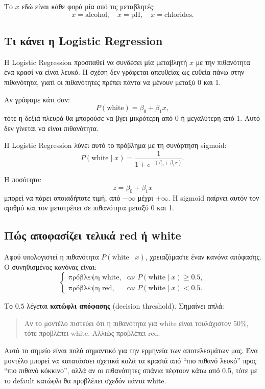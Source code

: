 \documentclass[11pt,a4paper]{article}
\newcommand{\eng}[1]{\textenglish{#1}}
\begin{document}
Το \(x\) εδώ είναι κάθε φορά μία από τις μεταβλητές:
\[
x = \text{alcohol}, \quad x = \text{pH}, \quad x = \text{chlorides}.
\]

\subsection{Τι κάνει η Logistic Regression}

Η Logistic Regression προσπαθεί να συνδέσει μία μεταβλητή \(x\) με την
πιθανότητα ένα κρασί να είναι λευκό. Η σχέση δεν γράφεται απευθείας ως
ευθεία πάνω στην πιθανότητα, γιατί οι πιθανότητες πρέπει πάντα να μένουν
μεταξύ 0 και 1.

Αν γράφαμε κάτι σαν:
\[
P(\text{white}) = \beta_0 + \beta_1 x,
\]
τότε η δεξιά πλευρά θα μπορούσε να βγει μικρότερη από 0 ή μεγαλύτερη από 1.
Αυτό δεν γίνεται να είναι πιθανότητα.

Η Logistic Regression λύνει αυτό το πρόβλημα με τη συνάρτηση sigmoid:
\[
P(\text{white} \mid x) =
\frac{1}{1 + e^{-(\beta_0 + \beta_1 x)}}.
\]

Η ποσότητα:
\[
z = \beta_0 + \beta_1 x
\]
μπορεί να πάρει οποιαδήποτε τιμή, από \(-\infty\) μέχρι \(+\infty\). Η sigmoid
παίρνει αυτόν τον αριθμό και τον μετατρέπει σε πιθανότητα μεταξύ 0 και 1.

\subsection{Πώς αποφασίζει τελικά red ή white}

Αφού υπολογιστεί η πιθανότητα \(P(\text{white} \mid x)\), χρειαζόμαστε έναν
κανόνα απόφασης. Ο συνηθισμένος κανόνας είναι:
\[
\begin{cases}
\text{πρόβλεψη white}, & \text{αν } P(\text{white} \mid x) \ge 0.5,\\
\text{πρόβλεψη red}, & \text{αν } P(\text{white} \mid x) < 0.5.
\end{cases}
\]

Το \(0.5\) λέγεται \textbf{κατώφλι απόφασης} (\eng{decision threshold}).
Σημαίνει απλά:
\begin{quote}
Αν το μοντέλο πιστεύει ότι η πιθανότητα για white είναι τουλάχιστον 50\%,
τότε προβλέπει white. Αλλιώς προβλέπει red.
\end{quote}

Αυτό το σημείο είναι πολύ σημαντικό για την ερμηνεία των αποτελεσμάτων μας.
Ένα μοντέλο μπορεί να κατατάσσει σχετικά καλά τα κρασιά από ``πιο πιθανό
λευκό'' προς ``πιο πιθανό κόκκινο'', αλλά αν οι πιθανότητες σπάνια πέφτουν
κάτω από 0.5, τότε με το default κατώφλι θα προβλέπει σχεδόν πάντα white.
\end{document}
